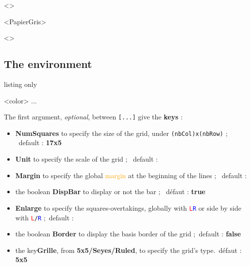 \documentclass[a4paper]{article}
\newcommand\Cle[1]{{\bfseries\sffamily\textlangle #1\textrangle}}
\begin{document}
\medskip

\DispGrid[NumSquares=18x4,Grid=Seyes,DispBar=false]<\ColSeyes>

\medskip

\DispGrid[NumSquares=36x8,Enlarge=3/3]<PapierGris>

\smallskip

\begin{center}
	\DispGrid[NumSquares=12x3,Grid=Ruled,Margin=2]<\ColRuled>
\end{center}

\pagebreak

\subsection{The environment}

\begin{PresentationCode}{listing only}

\begin{EnvGrid}[keys]<color>
	...
\end{EnvGrid}
\end{PresentationCode}

The first argument, \textit{optional}, between \texttt{[...]} give the \Cle{keys} :

\begin{itemize}
	\item \Cle{NumSquares} to specify the size of the grid, under \texttt{(nbCol)x(nbRow)} ; \hfill~default : \Cle{17x5}
	\item \Cle{Unit} to specify the scale of the grid ; \hfill~default : \Cle{1}
	\item \Cle{Margin} to specify the global \textcolor{orange}{margin} at the beginning of the lines ; \hfill~default : \Cle{0}
	\item the boolean \Cle{DispBar} to display or not the bar ; \hfill~défaut : \Cle{true}
	\item \Cle{Enlarge} to specify the squares-overtakings, globally with \texttt{\textcolor{red}{L}\textcolor{blue}{R}} or side by side with \texttt{\textcolor{red}{L}/\textcolor{blue}{R}} ;\hfill~default : \Cle{0}
	\item the boolean \Cle{Border} to display the basis border of the grid ;\hfill~default : \Cle{false}
	\item the key\Cle{Grille}, from \Cle{5x5/Seyes/Ruled}, to specify the grid's type.\hfill~défaut : \Cle{5x5}
\end{itemize}
\end{document}
